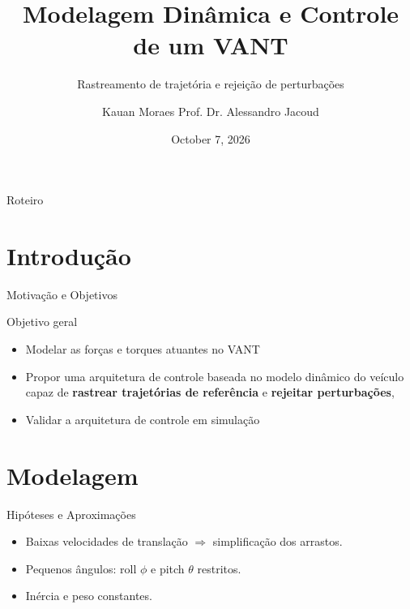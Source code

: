 \documentclass[aspectratio=169, 11pt]{beamer}
\title[Modelagem e Controle de VANT]{Modelagem Dinâmica e Controle de um VANT}
\subtitle{Rastreamento de trajetória e rejeição de perturbações}
\author[Kauan Moraes]{
  Kauan Moraes \newline
  Prof. Dr. Alessandro Jacoud
}
\institute[]{Universidade Federal do Rio de Janeiro} %
\date[Oct 7]{October 7, 2026} %
\begin{document}
\begin{frame}
  \titlepage
\end{frame}

\begin{frame}{Roteiro}
  \tableofcontents
\end{frame}

\section{Introdução}

\begin{frame}{Motivação e Objetivos}
  \begin{block}{Objetivo geral}
  \begin{itemize}
    \item Modelar as forças e torques atuantes no VANT
    \item Propor uma arquitetura de controle baseada no modelo dinâmico
    do veículo capaz de \textbf{rastrear trajetórias de referência} e
    \textbf{rejeitar perturbações},
    \item Validar a arquitetura de controle em simulação 
  \end{itemize}  
  \end{block}
\end{frame}

\section{Modelagem}
\begin{frame}{Hipóteses e Aproximações}
  \begin{itemize}
    \item Baixas velocidades de translação $\Rightarrow$ simplificação dos arrastos.
    \item Pequenos ângulos: roll $\phi$ e pitch $\theta$ restritos.
    \item Inércia e peso constantes. %
  \end{itemize}
\end{frame}
\end{document}
